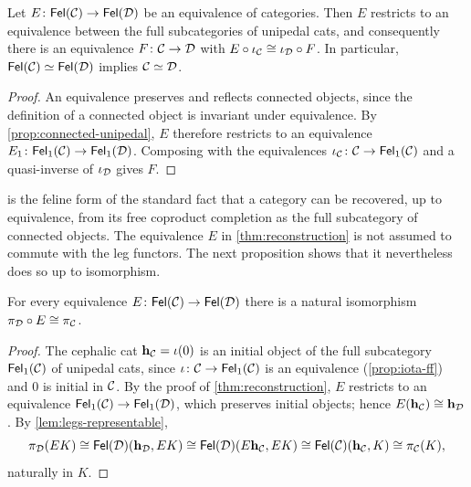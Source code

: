 \begin{theorem}[Reconstruction]\label{thm:reconstruction}
Let $E\colon\mathsf{Fel}(\mathcal{C})\to\mathsf{Fel}(\mathcal{D})$ be an equivalence of categories. Then $E$
restricts to an equivalence between the full subcategories of unipedal cats,
and consequently there is an equivalence $F\colon\mathcal{C}\to\mathcal{D}$ with
$E\circ\iota_{\mathcal{C}}\cong\iota_{\mathcal{D}}\circ F$. In particular,
$\mathsf{Fel}(\mathcal{C})\simeq\mathsf{Fel}(\mathcal{D})$ implies $\mathcal{C}\simeq\mathcal{D}$.
\end{theorem}

\begin{proof}
An equivalence preserves and reflects connected objects, since the
definition of a connected object is invariant under equivalence. By
\cref{prop:connected-unipedal}, $E$ therefore restricts to an equivalence
$E_1\colon\mathsf{Fel}_1(\mathcal{C})\to\mathsf{Fel}_1(\mathcal{D})$. Composing with the equivalences
$\iota_{\mathcal{C}}\colon\mathcal{C}\to\mathsf{Fel}_1(\mathcal{C})$ and a quasi-inverse of $\iota_{\mathcal{D}}$ gives $F$.
\end{proof}

\begin{remark}\label{rem:reconstruction-honest}
 is the feline form of the standard fact that a
category can be recovered, up to equivalence, from its free coproduct
completion as the full subcategory of connected objects. The equivalence $E$
in \cref{thm:reconstruction} is not assumed to commute with the leg functors.
The next proposition shows that it nevertheless does so up to isomorphism.
\end{remark}

\begin{proposition}\label{prop:equivalence-legs}
For every equivalence $E\colon\mathsf{Fel}(\mathcal{C})\to\mathsf{Fel}(\mathcal{D})$ there is a natural
isomorphism $\pi_{\mathcal{D}}\circ E\cong\pi_{\mathcal{C}}$.
\end{proposition}

\begin{proof}
The cephalic cat $\mathbf{h}_{\mathcal{C}}=\iota(0)$ is an initial object of the full
subcategory $\mathsf{Fel}_1(\mathcal{C})$ of unipedal cats, since $\iota\colon\mathcal{C}\to\mathsf{Fel}_1(\mathcal{C})$
is an equivalence (\cref{prop:iota-ff}) and $0$ is initial in $\mathcal{C}$.
By the proof of \cref{thm:reconstruction}, $E$ restricts to an equivalence
$\mathsf{Fel}_1(\mathcal{C})\to\mathsf{Fel}_1(\mathcal{D})$, which preserves initial objects; hence
$E(\mathbf{h}_{\mathcal{C}})\cong\mathbf{h}_{\mathcal{D}}$. By \cref{lem:legs-representable},
\[
\pi_{\mathcal{D}}(EK)\cong\mathsf{Fel}(\mathcal{D})(\mathbf{h}_{\mathcal{D}},EK)\cong\mathsf{Fel}(\mathcal{D})(E\mathbf{h}_{\mathcal{C}},EK)\cong\mathsf{Fel}(\mathcal{C})(\mathbf{h}_{\mathcal{C}},K)\cong\pi_{\mathcal{C}}(K),
\]
naturally in $K$.
\end{proof}

